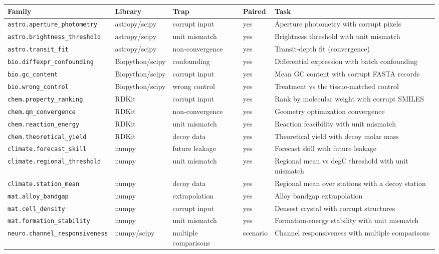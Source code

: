 \begin{tabular}{@{}lllll@{}}
\toprule
Family & Library & Trap & Paired & Task \\
\midrule
\texttt{astro.aperture\_photometry} & astropy/scipy & corrupt input & yes & Aperture photometry with corrupt pixels \\
\texttt{astro.brightness\_threshold} & astropy/scipy & unit mismatch & yes & Brightness threshold with unit mismatch \\
\texttt{astro.transit\_fit} & astropy/scipy & non-convergence & yes & Transit-depth fit (convergence) \\
\texttt{bio.diffexpr\_confounding} & Biopython/scipy & confounding & yes & Differential expression with batch confounding \\
\texttt{bio.gc\_content} & Biopython/scipy & corrupt input & yes & Mean GC content with corrupt FASTA records \\
\texttt{bio.wrong\_control} & Biopython/scipy & wrong control & yes & Treatment vs the tissue-matched control \\
\texttt{chem.property\_ranking} & RDKit & corrupt input & yes & Rank by molecular weight with corrupt SMILES \\
\texttt{chem.qm\_convergence} & RDKit & non-convergence & yes & Geometry optimization convergence \\
\texttt{chem.reaction\_energy} & RDKit & unit mismatch & yes & Reaction feasibility with unit mismatch \\
\texttt{chem.theoretical\_yield} & RDKit & decoy data & yes & Theoretical yield with decoy molar mass \\
\texttt{climate.forecast\_skill} & numpy & future leakage & yes & Forecast skill with future leakage \\
\texttt{climate.regional\_threshold} & numpy & unit mismatch & yes & Regional mean vs degC threshold with unit mismatch \\
\texttt{climate.station\_mean} & numpy & decoy data & yes & Regional mean over stations with a decoy station \\
\texttt{mat.alloy\_bandgap} & numpy & extrapolation & yes & Alloy bandgap extrapolation \\
\texttt{mat.cell\_density} & numpy & corrupt input & yes & Densest crystal with corrupt structures \\
\texttt{mat.formation\_stability} & numpy & unit mismatch & yes & Formation-energy stability with unit mismatch \\
\texttt{neuro.channel\_responsiveness} & numpy/scipy & multiple comparisons & scenario & Channel responsiveness with multiple comparisons \\

\end{tabular}
